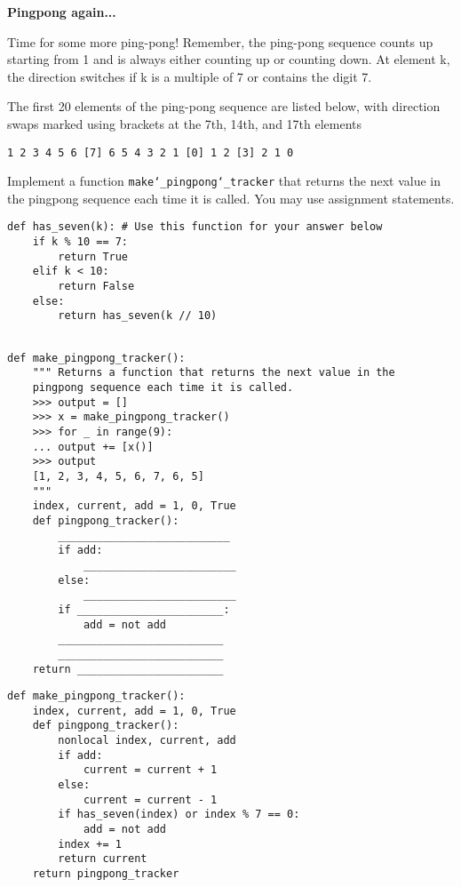 \begin{blocksection}
\question \textbf{Pingpong again...}\\
\begin{nonsol}
Time for some more ping-pong!
Remember, the ping-pong sequence counts up starting from 1 and is
always either counting up or counting down. At element k, the direction switches if k is a multiple of 7 or contains the
digit 7.

The first 20 elements of the ping-pong sequence are listed below, with direction
swaps marked using brackets at the 7th, 14th, and 17th elements
\begin{lstlisting}
1 2 3 4 5 6 [7] 6 5 4 3 2 1 [0] 1 2 [3] 2 1 0
\end{lstlisting}
\end{nonsol}

Implement a function \texttt{make\char`_pingpong\char`_tracker} that returns the
next value in the pingpong sequence each time it is called. You may use assignment statements.
\newline

\begin{lstlisting}
def has_seven(k): # Use this function for your answer below
    if k % 10 == 7:
        return True
    elif k < 10:
        return False
    else:
        return has_seven(k // 10)
\end{lstlisting}

\begin{nonsol}
\begin{lstlisting}

def make_pingpong_tracker():
    """ Returns a function that returns the next value in the
    pingpong sequence each time it is called.
    >>> output = []
    >>> x = make_pingpong_tracker()
    >>> for _ in range(9):
    ... output += [x()]
    >>> output
    [1, 2, 3, 4, 5, 6, 7, 6, 5]
    """
    index, current, add = 1, 0, True
    def pingpong_tracker():
        ___________________________
        if add:
            ________________________
        else:
            ________________________
        if _______________________:
            add = not add
        __________________________
        __________________________
    return _______________________
\end{lstlisting}
\end{nonsol}
\end{blocksection}

\begin{solution}
\begin{blocksection}
\begin{lstlisting}
def make_pingpong_tracker():
    index, current, add = 1, 0, True
    def pingpong_tracker():
        nonlocal index, current, add
        if add:
            current = current + 1
        else:
            current = current - 1
        if has_seven(index) or index % 7 == 0:
            add = not add
        index += 1
        return current
    return pingpong_tracker
\end{lstlisting}
\end{blocksection}
\end{solution}

